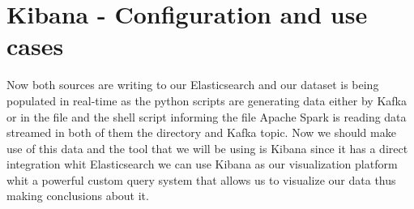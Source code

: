 \chapter{Kibana - Configuration and use cases}
\par Now both sources are writing to our Elasticsearch and our dataset is being populated in real-time as the python scripts are generating data either by Kafka or in the file and the shell script informing the file Apache Spark is reading data streamed in both of them the directory and Kafka topic. Now we should make use of this data and the tool that we will be using is Kibana since it has a direct integration whit Elasticsearch we can use Kibana as our visualization platform whit a powerful custom query system that allows us to visualize our data thus making conclusions about it.
